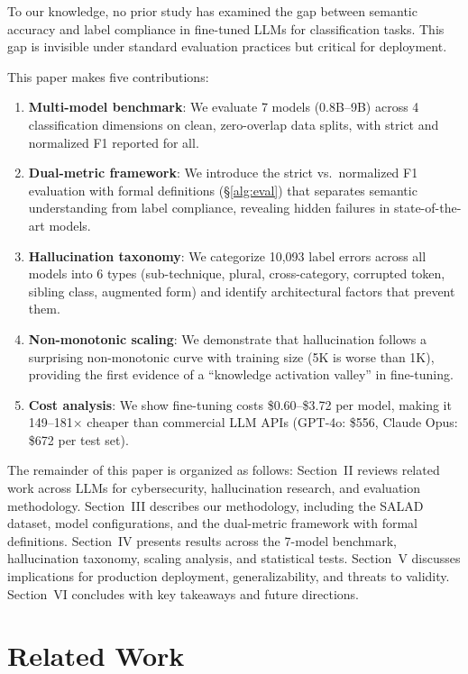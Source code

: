 \documentclass[journal]{IEEEtran}
\begin{document}
To our knowledge, no prior study has examined the gap between semantic accuracy and label compliance in fine-tuned LLMs for classification tasks. This gap is invisible under standard evaluation practices but critical for deployment.

This paper makes five contributions:
\begin{enumerate}
\item \textbf{Multi-model benchmark}: We evaluate 7 models (0.8B--9B) across 4 classification dimensions on clean, zero-overlap data splits, with strict and normalized F1 reported for all.
\item \textbf{Dual-metric framework}: We introduce the strict vs.\ normalized F1 evaluation with formal definitions (\S\ref{alg:eval}) that separates semantic understanding from label compliance, revealing hidden failures in state-of-the-art models.
\item \textbf{Hallucination taxonomy}: We categorize 10,093 label errors across all models into 6 types (sub-technique, plural, cross-category, corrupted token, sibling class, augmented form) and identify architectural factors that prevent them.
\item \textbf{Non-monotonic scaling}: We demonstrate that hallucination follows a surprising non-monotonic curve with training size (5K is worse than 1K), providing the first evidence of a ``knowledge activation valley'' in fine-tuning.
\item \textbf{Cost analysis}: We show fine-tuning costs \$0.60--\$3.72 per model, making it 149--181$\times$ cheaper than commercial LLM APIs (GPT-4o: \$556, Claude Opus: \$672 per test set).
\end{enumerate}

The remainder of this paper is organized as follows: Section~II reviews related work across LLMs for cybersecurity, hallucination research, and evaluation methodology. Section~III describes our methodology, including the SALAD dataset, model configurations, and the dual-metric framework with formal definitions. Section~IV presents results across the 7-model benchmark, hallucination taxonomy, scaling analysis, and statistical tests. Section~V discusses implications for production deployment, generalizability, and threats to validity. Section~VI concludes with key takeaways and future directions.

\section{Related Work}
\end{document}
